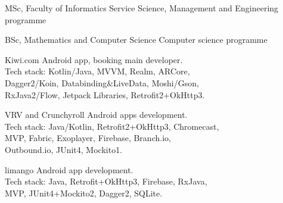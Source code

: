 \documentclass[12pt, a4paper]{article}
\begin{document}
\begin{minipage}[t]{0.6\textwidth}
    
    
    MSc, Faculty of Informatics \newline
    Service Science, Management and Engineering programme
    
    
    BSc, Mathematics and Computer Science \newline
    Computer science programme \newline
    
    
    \begin{sectionBody}
        \> Kiwi.com Android app, booking main developer. \\
        \> Tech stack: Kotlin/Java, MVVM, Realm, ARCore, \\
        \> Dagger2/Koin, Databinding\&LiveData, Moshi/Gson, \\
        \> RxJava2/Flow, Jetpack Libraries, Retrofit2+OkHttp3. \\
    \end{sectionBody}
    
    \begin{sectionBody}
        \> VRV and Crunchyroll Android apps development. \\
        \> Tech stack: Java/Kotlin, Retrofit2+OkHttp3, Chromecast, \\
        \> MVP, Fabric, Exoplayer, Firebase, Branch.io, \\
        \> Outbound.io, JUnit4, Mockito1. \\
    \end{sectionBody}
    
    \begin{sectionBody}
        \> limango Android app development. \\
        \> Tech stack: Java, Retrofit+OkHttp3, Firebase, RxJava, \\
        \> MVP, JUnit4+Mockito2, Dagger2, SQLite. \\
    \end{sectionBody}
    

\end{minipage}
\end{document}
